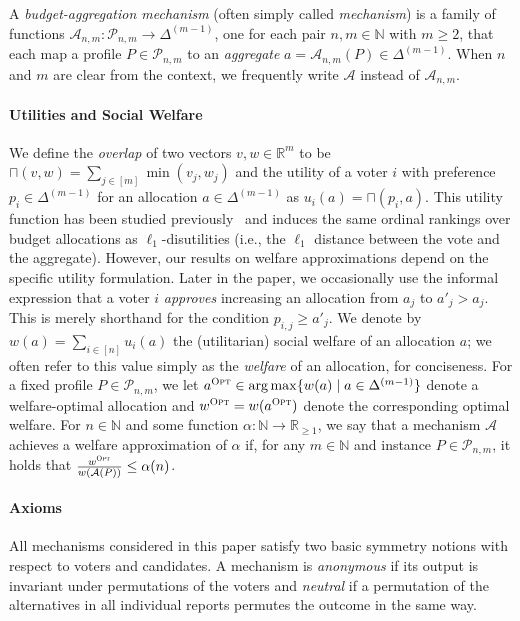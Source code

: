 \documentclass[11pt]{article}
\newcommand{\A}{\mathcal{A}}
\newcommand{\N}{\mathbb{N}}
\newcommand{\opt}{\textsc{Opt}}
\newcommand{\overlap}[2]{\sqcap(#1, #2)}
\begin{document}
A \emph{budget-aggregation mechanism} (often simply called \emph{mechanism}) is a family of functions $\A_{n,m}\colon \mathcal{P}_{n,m} \rightarrow \Delta^{(m-1)}$, one for each pair $n,m \in \N$ with $m \ge 2$, that each map a profile $P \in \mathcal{P}_{n,m}$ to an \emph{aggregate} $a = \A_{n,m}(P) \in \Delta^{(m-1)}$. When $n$ and $m$ are clear from the context, we frequently write $\mathcal{A}$ instead of $\mathcal{A}_{n,m}$.

\paragraph{Utilities and Social Welfare}

We define the \textit{overlap} of two vectors $v,w \in \mathbb{R}^m$ to be $\overlap{v}{w} = \sum_{j\in [m]} \min(v_j, w_j)$ and the utility of a voter $i$ with preference $p_i \in  \Delta^{(m-1)}$ for an allocation $a \in \Delta^{(m-1)}$ as $u_i(a) = \overlap{p_i}{a}$. This utility function has been studied previously~\citep{goel2019knapsack,nehring2019resource} and induces the same ordinal rankings over budget allocations as $\ell_1$-disutilities (i.e., the $\ell_1$ distance between the vote and the aggregate). However, our results on welfare approximations depend on the specific utility formulation. Later in the paper, we occasionally use the informal expression that a voter $i$ \emph{approves} increasing an allocation from $a_j$ to $a'_j > a_j$. This is merely shorthand for the condition $p_{i,j} \geq a'_j$. We denote by $w(a) = \sum_{i \in [n]} u_i(a)$ the (utilitarian) social welfare of an allocation $a$; we often refer to this value simply as the \textit{welfare} of an allocation, for conciseness. %
For a fixed profile $P \in \mathcal{P}_{n,m}$, we let $a^\opt\in \arg\max \{w(a)\mid a\in \Delta^{(m-1)}\}$ denote a welfare-optimal allocation and $w^\opt = w(a^\opt)$ denote the corresponding optimal welfare.
For $n\in \N$ and some function $\alpha\colon \mathbb{N} \rightarrow \mathbb{R}_{\geq 1}$, we say that a mechanism $\A$ achieves a welfare approximation of $\alpha$ if, for any $m\in \N$ and instance $P \in \mathcal{P}_{n,m}$, it holds that $\frac{w^\opt}{w(\A(P))} \le \alpha(n)$. 




\paragraph{Axioms}
All mechanisms considered in this paper satisfy two basic symmetry notions with respect to voters and candidates.
A mechanism is \textit{anonymous} if its output is invariant under permutations of the voters and \textit{neutral} if a permutation of the alternatives in all individual reports permutes the outcome in the same way. 
\end{document}
